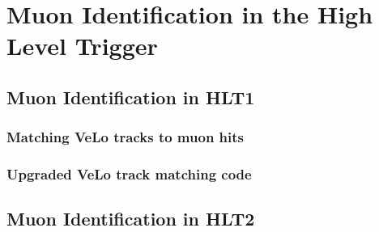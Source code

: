 
\chapter{Muon Identification in the \lhcb High Level Trigger}
\label{Muon_id_hlt}

\section{Muon Identification in HLT1}

\subsection{Matching VeLo tracks to muon hits}
\subsection{Upgraded VeLo track matching code}

\section{Muon Identification in HLT2}

